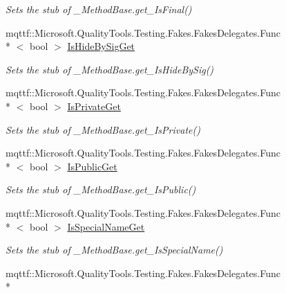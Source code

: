\begin{DoxyCompactItemize}
\begin{DoxyCompactList}\small\item\em Sets the stub of \-\_\-\-Method\-Base.\-get\-\_\-\-Is\-Final()\end{DoxyCompactList}\item 
mqttf\-::\-Microsoft.\-Quality\-Tools.\-Testing.\-Fakes.\-Fakes\-Delegates.\-Func\\*
$<$ bool $>$ \hyperlink{class_system_1_1_runtime_1_1_interop_services_1_1_fakes_1_1_stub___method_base_a2916cad00b6e7a8d6d26d98ede443983}{Is\-Hide\-By\-Sig\-Get}
\begin{DoxyCompactList}\small\item\em Sets the stub of \-\_\-\-Method\-Base.\-get\-\_\-\-Is\-Hide\-By\-Sig()\end{DoxyCompactList}\item 
mqttf\-::\-Microsoft.\-Quality\-Tools.\-Testing.\-Fakes.\-Fakes\-Delegates.\-Func\\*
$<$ bool $>$ \hyperlink{class_system_1_1_runtime_1_1_interop_services_1_1_fakes_1_1_stub___method_base_aa253b2599fe9528a66f27269564659fc}{Is\-Private\-Get}
\begin{DoxyCompactList}\small\item\em Sets the stub of \-\_\-\-Method\-Base.\-get\-\_\-\-Is\-Private()\end{DoxyCompactList}\item 
mqttf\-::\-Microsoft.\-Quality\-Tools.\-Testing.\-Fakes.\-Fakes\-Delegates.\-Func\\*
$<$ bool $>$ \hyperlink{class_system_1_1_runtime_1_1_interop_services_1_1_fakes_1_1_stub___method_base_a965ac3a9333b2373ed7cb6a4ef412722}{Is\-Public\-Get}
\begin{DoxyCompactList}\small\item\em Sets the stub of \-\_\-\-Method\-Base.\-get\-\_\-\-Is\-Public()\end{DoxyCompactList}\item 
mqttf\-::\-Microsoft.\-Quality\-Tools.\-Testing.\-Fakes.\-Fakes\-Delegates.\-Func\\*
$<$ bool $>$ \hyperlink{class_system_1_1_runtime_1_1_interop_services_1_1_fakes_1_1_stub___method_base_a69e48a79edc7c76d38c64d9f5e5f4604}{Is\-Special\-Name\-Get}
\begin{DoxyCompactList}\small\item\em Sets the stub of \-\_\-\-Method\-Base.\-get\-\_\-\-Is\-Special\-Name()\end{DoxyCompactList}\item 
mqttf\-::\-Microsoft.\-Quality\-Tools.\-Testing.\-Fakes.\-Fakes\-Delegates.\-Func\\*

\end{DoxyCompactItemize}
